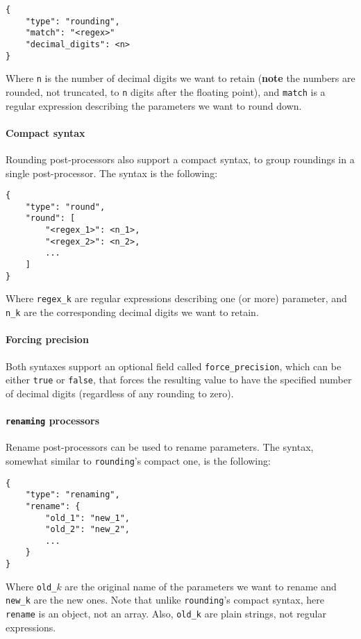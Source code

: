 \documentclass[11pt,notitlepage,twoside,a4paper]{article}
\begin{document}
\begin{lstlisting}
{
    "type": "rounding",
    "match": "<regex>"
    "decimal_digits": <n>
}
\end{lstlisting}

\noindent
Where \texttt{n} is the number of decimal digits we want to retain
(\textbf{note} the numbers are rounded, not truncated, to \texttt{n}
digits after the floating point), and \texttt{match} is a regular
expression describing the parameters we want to round down.

\paragraph{Compact syntax} Rounding post-processors also support a compact syntax, to group
roundings in a single post-processor. The syntax is the following:

\begin{lstlisting}
{
    "type": "round",
    "round": [
        "<regex_1>": <n_1>,
        "<regex_2>": <n_2>,
        ...
    ]
}
\end{lstlisting}

\noindent
Where \texttt{regex\_k} are regular expressions describing one (or more)
parameter, and \texttt{n\_k} are the corresponding decimal digits we
want to retain.

\paragraph{Forcing precision} Both syntaxes support an optional field called
\texttt{force\_precision}, which can be either \texttt{true} or
\texttt{false}, that forces the resulting value to have the specified
number of decimal digits (regardless of any rounding to zero).

\paragraph{\texttt{renaming} processors}

Rename post-processors can be used to rename parameters. The syntax,
somewhat similar to \texttt{rounding}'s compact one, is the following:

\begin{lstlisting}
{
    "type": "renaming",
    "rename": {
        "old_1": "new_1",
        "old_2": "new_2",
        ...
    }
}
\end{lstlisting}

\noindent
Where \texttt{old\_$k$} are the original name of the parameters we want to
rename and \texttt{new\_k} are the new ones. Note that unlike
\texttt{rounding}'s compact syntax, here \texttt{rename} is an object,
not an array. Also, \texttt{old\_k} are plain strings, not regular
expressions.
\end{document}
